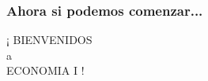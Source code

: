\documentclass[14pt]{beamer}
\begin{document}
\begin{frame}
\frametitle{Ahora si podemos comenzar...}
\centering
\huge
¡ BIENVENIDOS \\ \vspace{3mm} a \\ \vspace{3mm} ECONOMIA I !
\end{frame}
\end{document}
